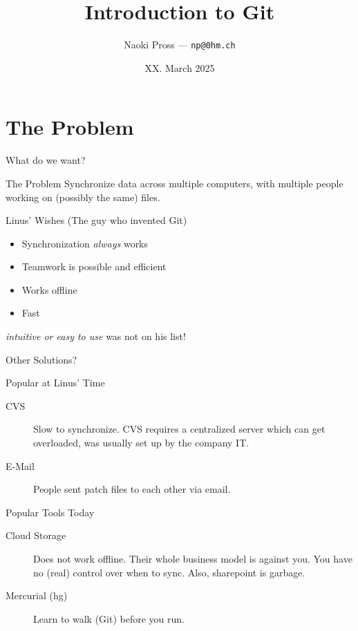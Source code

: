 \documentclass[xetex, handout]{beamer}
\title{Introduction to Git}
\author{
  Naoki Pross --- \texttt{np@0hm.ch}
}
\institute{}
\date{XX. March 2025}
\begin{document}
\frame{\titlepage}

\section{The Problem}

\begin{frame}{What do we want?}
  \begin{alertblock}{The Problem}
    Synchronize data across multiple computers, with multiple people working on
    (possibly the same) files.
  \end{alertblock}
  \pause

  \begin{block}{Linus' Wishes (The guy who invented Git)}
    \begin{itemize}
      \item Synchronization \emph{always} works
      \item Teamwork is possible and efficient
      \item Works offline
      \item Fast
    \end{itemize}
    \emph{intuitive or easy to use} was not on his list!
  \end{block}
\end{frame}

\begin{frame}{Other Solutions?}
  \begin{block}{Popular at Linus' Time}
    \begin{description}
      \item[CVS] Slow to synchronize. CVS requires a centralized server which
        can get overloaded, was usually set up by the company IT.
      \item[E-Mail] People sent patch files to each other via email.
    \end{description}
  \end{block}
  \begin{block}{Popular Tools Today}
    \begin{description}
      \item[Cloud Storage] Does not work offline. Their whole business model is
        against you. You have no (real) control over when to sync. Also,
        sharepoint is garbage.

      \item[Mercurial (hg)] Learn to walk (Git) before you run.
    \end{description}
  \end{block}
\end{frame}
\end{document}
